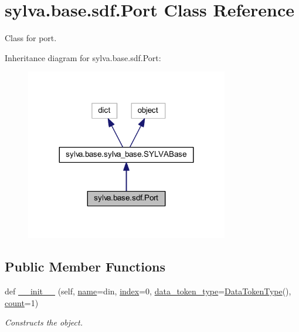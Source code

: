 \hypertarget{classsylva_1_1base_1_1sdf_1_1_port}{}\section{sylva.\+base.\+sdf.\+Port Class Reference}
\label{classsylva_1_1base_1_1sdf_1_1_port}


Class for port.  




Inheritance diagram for sylva.\+base.\+sdf.\+Port\+:\nopagebreak
\begin{figure}[H]
\begin{center}
\leavevmode
\includegraphics[width=251pt]{classsylva_1_1base_1_1sdf_1_1_port__inherit__graph}
\end{center}
\end{figure}
\subsection*{Public Member Functions}
\begin{DoxyCompactItemize}
\item 
def \hyperlink{classsylva_1_1base_1_1sdf_1_1_port_a1c7835010686c34d2f024b716ac89e38}{\+\_\+\+\_\+init\+\_\+\+\_\+} (self, \hyperlink{classsylva_1_1base_1_1sdf_1_1_port_aa8aa0ac5a7e375e2c0cb6e92a0b1dd20}{name}=\textquotesingle{}din\textquotesingle{}, \hyperlink{classsylva_1_1base_1_1sdf_1_1_port_abbfd66f762649b6a8105657259471c5a}{index}=0, \hyperlink{classsylva_1_1base_1_1sdf_1_1_port_ac0ca6b47887a32c69c66564f683adf2b}{data\+\_\+token\+\_\+type}=\hyperlink{classsylva_1_1base_1_1sdf_1_1_data_token_type}{Data\+Token\+Type}(), \hyperlink{classsylva_1_1base_1_1sdf_1_1_port_aec009757acfd92df95b273c671cac068}{count}=1)
\begin{DoxyCompactList}\small\item\em Constructs the object. \end{DoxyCompactList}\end{DoxyCompactItemize}
